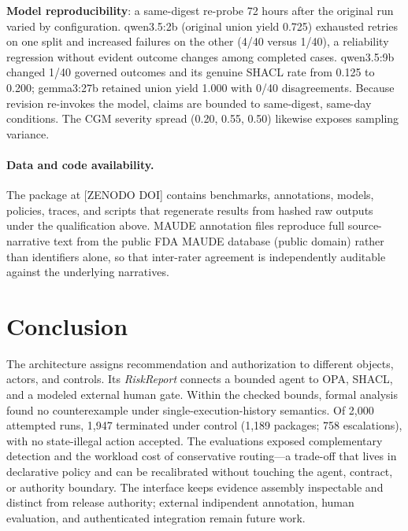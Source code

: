 \documentclass[journal,twoside,web]{ieeecolor}
\begin{document}
\textbf{Model reproducibility}: a same-digest re-probe 72 hours after the original run varied by configuration. qwen3.5:2b (original union yield 0.725) exhausted retries on one split and increased failures on the other (4/40 versus 1/40), a reliability regression without evident outcome changes among completed cases. qwen3.5:9b changed 1/40 governed outcomes and its genuine SHACL rate from 0.125 to 0.200; gemma3:27b retained union yield 1.000 with 0/40 disagreements. Because revision re-invokes the model, claims are bounded to same-digest, same-day conditions. The CGM severity spread (0.20, 0.55, 0.50) likewise exposes sampling variance.

\paragraph{Data and code availability.} The package at [ZENODO DOI] contains benchmarks, annotations, models, policies, traces, and scripts that regenerate results from hashed raw outputs under the qualification above. MAUDE annotation files reproduce full source-narrative text from the public FDA MAUDE database (public domain) rather than identifiers alone, so that inter-rater agreement is independently auditable against the underlying narratives.

 \section{Conclusion}

The architecture assigns recommendation and authorization to different objects, actors, and controls. Its \textit{RiskReport} connects a bounded agent to OPA, SHACL, and a modeled external human gate. Within the checked bounds, formal analysis found no counterexample under single-execution-history semantics. Of 2,000 attempted runs, 1,947 terminated under control (1,189 packages; 758 escalations), with no state-illegal action accepted. The evaluations exposed complementary detection and the workload cost of conservative routing---a trade-off that lives in declarative policy and can be recalibrated without touching the agent, contract, or authority boundary. The interface keeps evidence assembly inspectable and distinct from release authority; external indipendent annotation, human evaluation, and authenticated integration remain future work.
\end{document}
